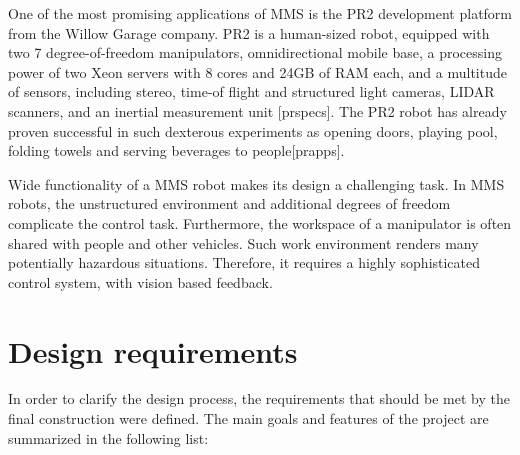 
One of the most promising applications of MMS is the PR2 development platform from the Willow Garage company. PR2 is a human-sized robot, equipped with two 7 degree-of-freedom manipulators, omnidirectional mobile base, a processing power of two Xeon servers with 8 cores and 24GB of RAM each, and a multitude of sensors, including stereo, time-of flight and structured light cameras, LIDAR scanners, and an inertial measurement unit [prspecs]. The PR2 robot has already proven successful in such dexterous experiments as opening doors, playing pool, folding towels and serving beverages to people[prapps]. 

Wide functionality of a MMS robot makes its design a challenging task. In MMS robots, the unstructured environment and additional degrees of freedom complicate the control task. Furthermore, the workspace of a manipulator is often shared with people and other vehicles. Such work environment renders many potentially hazardous situations. Therefore, it requires a highly sophisticated control system, with vision based feedback. 


\section{Design requirements}
\label{sec:require}

In order to clarify the design process, the requirements that should be met by the final construction were defined. The main goals and features of the project are summarized in the following list:

